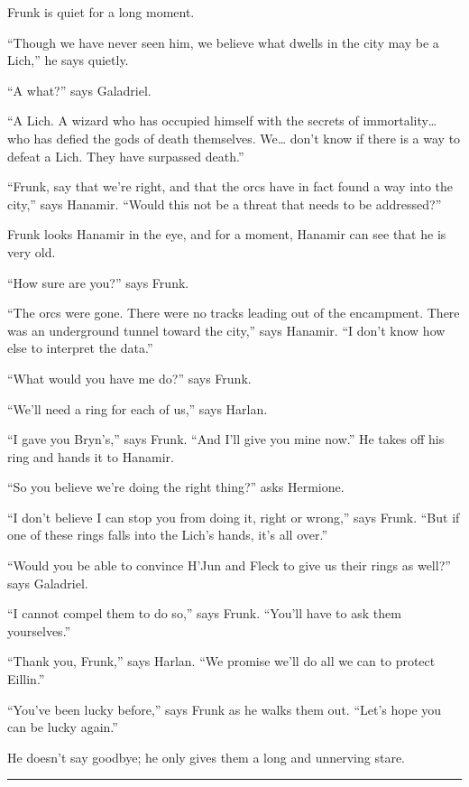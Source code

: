 \documentclass[smalldemyvopaper,11pt,twoside,onecolumn,openright,extrafontsizes]{memoir}
\begin{document}
Frunk is quiet for a long moment.

``Though we have never seen him, we believe what dwells in the city may
be a Lich,'' he says quietly.

``A what?'' says Galadriel.

``A Lich. A wizard who has occupied himself with the secrets of
immortality\ldots{} who has defied the gods of death themselves.
We\ldots{} don't know if there is a way to defeat a Lich. They have
surpassed death.''

``Frunk, say that we're right, and that the orcs have in fact found a
way into the city,'' says Hanamir. ``Would this not be a threat that
needs to be addressed?''

Frunk looks Hanamir in the eye, and for a moment, Hanamir can see that
he is very old.

``How sure are you?'' says Frunk.

``The orcs were gone. There were no tracks leading out of the
encampment. There was an underground tunnel toward the city,'' says
Hanamir. ``I don't know how else to interpret the data.''

``What would you have me do?'' says Frunk.

``We'll need a ring for each of us,'' says Harlan.

``I gave you Bryn's,'' says Frunk. ``And I'll give you mine now.'' He
takes off his ring and hands it to Hanamir.

``So you believe we're doing the right thing?'' asks Hermione.

``I don't believe I can stop you from doing it, right or wrong,'' says
Frunk. ``But if one of these rings falls into the Lich's hands, it's all
over.''

``Would you be able to convince H'Jun and Fleck to give us their rings
as well?'' says Galadriel.

``I cannot compel them to do so,'' says Frunk. ``You'll have to ask them
yourselves.''

``Thank you, Frunk,'' says Harlan. ``We promise we'll do all we can to
protect Eillin.''

``You've been lucky before,'' says Frunk as he walks them out. ``Let's
hope you can be lucky again.''

He doesn't say goodbye; he only gives them a long and unnerving stare.

\begin{center}\rule{0.5\linewidth}{\linethickness}\end{center}
\end{document}

